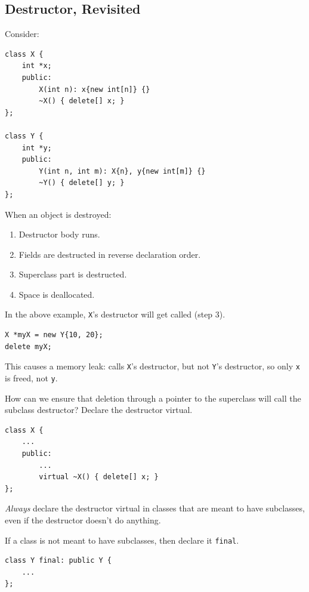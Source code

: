 \documentclass[11pt]{article}
\theoremstyle{definition}
\begin{document}
\subsection{Destructor, Revisited}
Consider:
\begin{lstlisting}
class X {
    int *x;
    public:
        X(int n): x{new int[n]} {}
        ~X() { delete[] x; }
};

class Y {
    int *y;
    public:
        Y(int n, int m): X{n}, y{new int[m]} {}
        ~Y() { delete[] y; }
};
\end{lstlisting}
\vspace{-0.25cm}
When an object is destroyed:\vspace{-0.25cm}
\begin{enumerate}
    \item Destructor body runs.
    \item Fields are destructed in reverse declaration order.
    \item Superclass part is destructed.
    \item Space is deallocated.
\end{enumerate}
\vspace{-0.25cm}
In the above example, {\tt X}'s destructor will get called (step 3).
\begin{lstlisting}
X *myX = new Y{10, 20};
delete myX; 
\end{lstlisting}
\vspace{-0.25cm}
This causes a memory leak: calls {\tt X}'s destructor, but not {\tt Y}'s destructor, so only {\tt x} is freed, not {\tt y}.

How can we ensure that deletion through a pointer to the superclass will call the subclass destructor? Declare the destructor virtual.
\begin{lstlisting}
class X {
    ...
    public:
        ...
        virtual ~X() { delete[] x; }
};
\end{lstlisting}
\vspace{-0.25cm}
{\it Always} declare the destructor virtual in classes that are meant to have subclasses, even if the destructor doesn't do anything. 

If a class is not meant to have subclasses, then declare it {\tt final}.
\begin{lstlisting}
class Y final: public Y {
    ...
};
\end{lstlisting}
\end{document}
